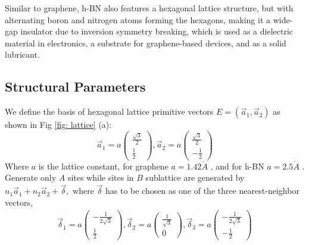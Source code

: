 Similar to graphene, \gls{h-BN} also features a hexagonal lattice structure, but with alternating boron and nitrogen atoms forming the hexagons, making it a wide-gap insulator due to inversion symmetry breaking, which is used as a dielectric material in electronics, a substrate for graphene-based devices, and as a solid lubricant.
\subsection{Structural Parameters}
 We define the basis of hexagonal lattice primitive vectors $E = (\vec{a}_{1}, \vec{a}_{2})$ as shown in Fig \ref{fig: lattice} (a):
$$
\vec{a}_{1}=a\left(\begin{array}{l}
\frac{\sqrt{3}}{2} \\
\frac{1}{2}
\end{array}\right),
\vec{a}_{2}=a\left(\begin{array}{l}
\frac{\sqrt{3}}{2} \\
-\frac{1}{2}
\end{array}\right)
$$
Where $a$ is the lattice constant, for graphene $a= 1.42 \mathring{A}$ \cite{sarma2011electronic}, and for \gls{h-BN} $a= 2.5 \mathring{A}$ \cite{PhysRevB.81.155433}. Generate only $A$ sites while sites in $B$ sublattice are generated by $n_{1} \vec{a}_{1}+n_{2} \vec{a}_{2}+\vec{\delta},$ where $\vec{\delta}$ has to be chosen as one of the three nearest-neighbor vectors,
$$
\begin{array}{c}
\vec{\delta}_{1}=a\left(\begin{array}{l}
-\frac{1}{2 \sqrt{3}}\\ \frac{1}{2}\end{array}\right), 
\vec{\delta}_{2}=a\left(\begin{array}{l}\frac{1}{\sqrt{3}}\\ 0 \end{array}\right),
\vec{\delta}_{3}=a\left(\begin{array}{l} -\frac{1}{2 \sqrt{3}}\\ -\frac{1}{2}\end{array}\right)
\end{array}
$$
